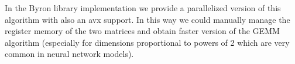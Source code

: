 \documentclass{standalone}
\begin{document}
In the \textsf{Byron} library implementation we provide a parallelized version of this algorithm with also an \textsf{avx} support.
In this way we could manually manage the register memory of the two matrices and obtain faster version of the \textsf{GEMM} algorithm (especially for dimensions proportional to powers of 2 which are very common in neural network models).
\end{document}
